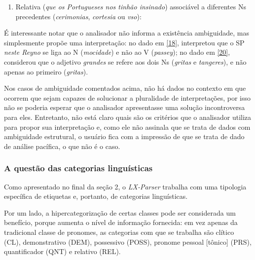 \documentclass[portuguese]{textolivre}
\begin{document}
\begin{enumerate}[label=\alph*)]
\item Relativa (\textit{que os Portugueses nos tinhão insinado}) associável a diferentes Ns precedentes (\textit{cerimonias}, \textit{cortesia} ou \textit{vso}):

\end{enumerate}

É interessante notar que o analisador não informa a existência ambiguidade, mas simplesmente propõe uma interpretação: no dado em \ref{18}, interpretou que o SP \textit{neste Reyno} se liga ao N (\textit{mocidade}) e não ao V (\textit{passey}); no dado em \ref{20}, considerou que o adjetivo \textit{grandes} se refere aos dois Ns (\textit{gritas} e \textit{tangeres}), e não apenas ao primeiro (\textit{gritas}).

Nos casos de ambiguidade comentados acima, não há dados no contexto em que ocorrem que sejam capazes de solucionar a pluralidade de interpretações, por isso não se poderia esperar que o analisador apresentasse uma solução incontroversa para eles. Entretanto, não está claro quais são os critérios que o analisador utiliza para propor sua interpretação e, como ele não assinala que se trata de dados com ambiguidade estrutural, o usuário fica com a impressão de que se trata de dado de análise pacífica, o que não é o caso.

\subsubsection{A questão das categorias linguísticas}

Como apresentado no final da seção 2, o \textit{LX-Parser} trabalha com uma tipologia específica de etiquetas e, portanto, de categorias linguísticas.

Por um lado, a hipercategorização de certas classes pode ser considerada um benefício, porque aumenta o nível de informação fornecida: em vez apenas da tradicional classe de pronomes, as categorias com que se trabalha são clítico (CL), demonstrativo (DEM), possessivo (POSS), pronome pessoal [tônico] (PRS), quantificador (QNT) e relativo (REL).
\end{document}
